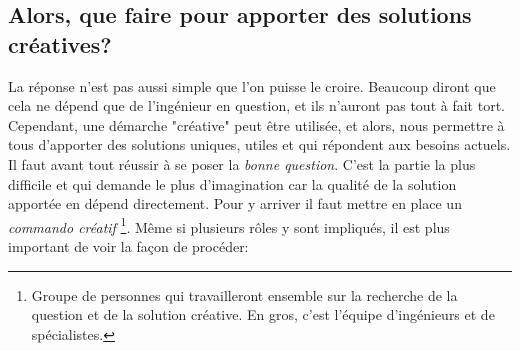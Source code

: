 \subsection{Alors, que faire pour apporter des solutions créatives?}

La réponse n'est pas aussi simple que l'on puisse le croire. Beaucoup diront que cela ne dépend que de l'ingénieur en question, et ils n'auront pas tout à fait tort. Cependant, une démarche "créative" peut être utilisée, et alors, nous permettre à tous d'apporter des solutions uniques, utiles et qui répondent aux besoins actuels. Il faut avant tout réussir à se poser la \textit{bonne question}. C'est la partie la plus difficile et qui demande le plus d'imagination car la qualité de la solution apportée en dépend directement. Pour y arriver il faut mettre en place un \textit{commando créatif} \footnote{Groupe de personnes qui travailleront ensemble sur la recherche de la question et de la solution créative. En gros, c'est l’équipe d'ingénieurs et de spécialistes.}. Même si plusieurs rôles y sont impliqués, il est plus important de voir la façon de procéder:

